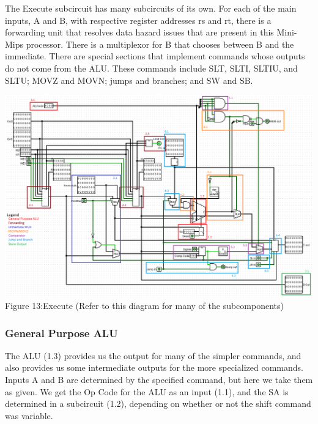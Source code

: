 \documentclass{article}
\begin{document}
The Execute subcircuit has many subcircuits of its own. For each of the main inputs, A and B, with respective register addresses rs and rt, there is a forwarding unit that resolves data hazard issues that are present in this Mini-Mips processor. There is a multiplexor for B that chooses between B and the immediate. There are special sections that implement commands whose outputs do not come from the ALU. These commands include SLT, SLTI, SLTIU, and SLTU; MOVZ and MOVN; jumps and branches; and SW and SB. \vspace{-.2cm}
\begin{center}
\includegraphics[width=14cm]{EXOVER.png}\\
Figure 13:Execute (Refer to this diagram for many of the subcomponents)
\end{center}

\subsubsection{General Purpose ALU}
The ALU (1.3) provides us the output for many of the simpler commands, and also provides us some intermediate outputs for the more specialized commands. Inputs A and B are determined by the specified command, but here we take them as given. We get the Op Code for the ALU as an input (1.1), and the SA is determined in a subcircuit (1.2), depending on whether or not the shift command was variable. 
\end{document}

